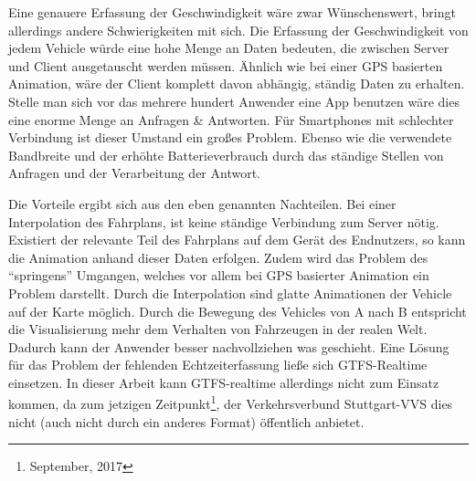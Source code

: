   Eine genauere Erfassung der Geschwindigkeit wäre zwar Wünschenswert, bringt allerdings andere Schwierigkeiten mit sich. Die Erfassung der Geschwindigkeit von jedem Vehicle würde eine hohe Menge an Daten bedeuten, die zwischen Server und Client ausgetauscht werden müssen. Ähnlich wie bei einer GPS basierten Animation, wäre der Client komplett davon abhängig, ständig Daten zu erhalten. Stelle man sich vor das mehrere hundert Anwender eine App benutzen wäre dies eine enorme Menge an Anfragen \& Antworten. Für Smartphones mit schlechter Verbindung ist dieser Umstand ein großes Problem. Ebenso wie die verwendete Bandbreite und der erhöhte Batterieverbrauch durch das ständige Stellen von Anfragen und der Verarbeitung der Antwort.

  Die Vorteile ergibt sich aus den eben genannten Nachteilen. Bei einer Interpolation des Fahrplans, ist keine ständige Verbindung zum Server nötig. Existiert der relevante Teil des Fahrplans auf dem Gerät des Endnutzers, so kann die Animation anhand dieser Daten erfolgen. Zudem wird das Problem des "`springens"' Umgangen, welches vor allem bei GPS basierter Animation ein Problem darstellt. Durch die Interpolation sind glatte Animationen der Vehicle auf der Karte möglich. Durch die Bewegung des Vehicles von A nach B entspricht die Visualisierung mehr dem Verhalten von Fahrzeugen in der realen Welt. Dadurch kann der Anwender besser nachvollziehen was geschieht.
  Eine Lösung für das Problem der fehlenden Echtzeiterfassung ließe sich GTFS-Realtime einsetzen. In dieser Arbeit kann GTFS-realtime allerdings nicht zum Einsatz kommen, da zum jetzigen Zeitpunkt\footnote{September, 2017}, der Verkehrsverbund Stuttgart-VVS dies nicht (auch nicht durch ein anderes Format) öffentlich anbietet.
  
